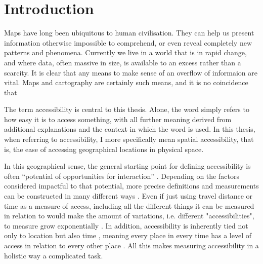 \section{Introduction}



Maps have long been ubiquitous to human civilisation.
They can help us present information otherwise impossible to comprehend,
or even reveal completely new patterns and phenomena.
Currently we live in a world that is in rapid change, and where data,
often massive in size, is available to an excess rather than a scarcity.
It is clear that any means to make sense of an overflow of informaion are vital.
Maps and cartography are certainly such means,
and it is no coincidence that \textcite{kra2021}




The term accessibility is central to this thesis.
Alone, the word simply refers to how easy it is to access something,
with all further meaning derived from
additional explanations and the context in which the word is used.
In this thesis, when referring to accessibility,
I more specifically mean spatial accessibility,
that is, the ease of accessing geographical locations in physical space.

In this geographical sense,
the general starting point for defining accessibility is often
\enquote{potential of opportunities for interaction} \parencite{han1959}.  %
Depending on the factors considered impactful to that potential,
more precise definitions and measurements can be constructed in many different ways
\parencite{pap2016}.
Even if just using travel distance or time as a measure of access,
including all the different things it can be measured in relation to
would make the amount of variations, i.e. different "accessibilities",
to measure grow exponentially \parencite{lev2020}.
In addition, accessibility is inherently tied not only to location
but also time \parencite{jar2018},
meaning every place in every time has a level of access
in relation to every other place \parencite{lev2020}.
All this makes measuring accessibility in a holistic way a complicated task.

